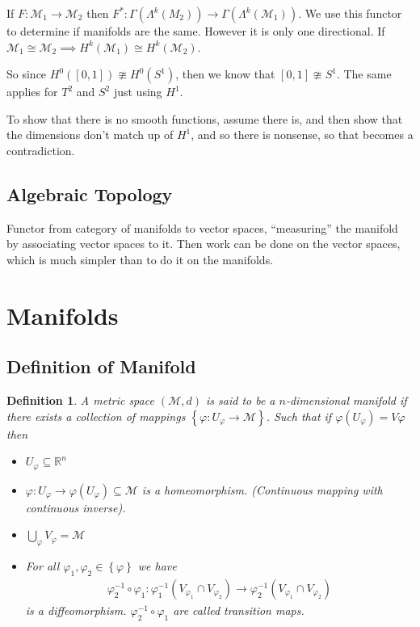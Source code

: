 \documentclass[10pt]{amsart}
\newtheorem{definition}{Definition}[section]
\newcommand{\ra}{\rightarrow}
\newcommand{\M}{\mathcal{M}}
\newcommand{\R}{\mathbb{R}}
\newcommand{\vp}{\varphi}
\renewcommand{\o}{\circ}
\renewcommand{\i}{^{-1}}
\renewcommand{\*}{\star}
\begin{document}
If $F:\M_1\ra\M_2$ then $F^*:\Gamma(\Lambda^k(M_2))\ra\Gamma(\Lambda^k(\M_1))$.
We use this functor to determine if manifolds are the same. However it is only
one directional. If $\M_1\cong\M_2\implies H^k(\M_1)\cong H^k(\M_2)$.

So since $H^0([0,1])\ncong H^0(S^1)$, then we know that $[0,1]\ncong S^1$. The
same applies for $T^2$ and $S^2$ just using $H^1$.

To show that there is no smooth functions, assume there is, and then show that
the dimensions don't match up of $H^1$, and so there is nonsense, so that
becomes a contradiction.

\subsection{Algebraic Topology}%
\label{sub:algebraic_topology}

Functor from category of manifolds to vector spaces, ``measuring'' the manifold
by associating vector spaces to it. Then work can be done on the vector spaces,
which is much simpler than to do it on the manifolds.

\section{Manifolds}%
\label{sec:manifolds}

\subsection{Definition of Manifold}%
\label{sub:definition_of_manifold}

\begin{definition}
  A metric space $(\M,d)$ is said to be a $n$-dimensional manifold if there
  exists a collection of mappings $\left\{\vp:U_\vp\ra\M\right\}$. Such that if
  $\vp(U_\vp)=V\vp$ then
  \begin{itemize}
    \item $U_\vp\subseteq \R^n$
    \item $\vp:U_\vp\ra\vp(U_\vp)\subseteq\M$ is a homeomorphism. (Continuous
      mapping with continuous inverse).
    \item $\bigcup_\vp V_\vp=\M$
    \item For all $\vp_1,\vp_2\in\left\{\vp\right\}$ we have
      \begin{align*}
        \vp_2\i\o\vp_1:\vp_1\i(V_{\vp_1}\cap V_{\vp_2})\ra\vp_2\i(V_{\vp_1}\cap V_{\vp_2})
      \end{align*}
      is a diffeomorphism. $\vp_2\i\o\vp_1$ are called transition maps.
  \end{itemize}
\end{definition}
\end{document}
